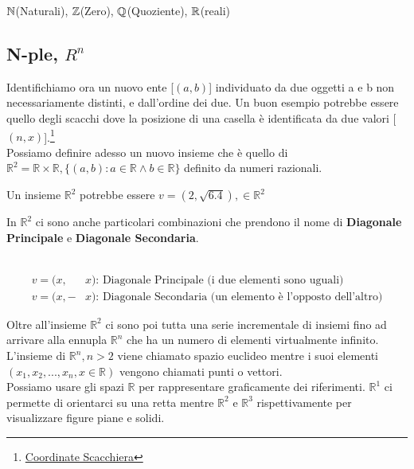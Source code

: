 $\mathbb{\MakeUppercase{n}}$(Naturali),
$\mathbb{\MakeUppercase{z}}$(Zero),
$\mathbb{\MakeUppercase{q}}$(Quoziente), $\mathbb{\MakeUppercase{r}}$(reali)

\subsection{N-ple, $R^n$}

Identifichiamo ora un nuovo ente [$(a,b)$] individuato da due oggetti
a e b non necessariamente distinti, e dall'ordine dei due. Un buon
esempio potrebbe essere quello degli scacchi dove la posizione di una
casella è identificata da due valori
[$(n,x)$].\footnote{\href{https://upload.wikimedia.org/wikipedia/commons/thumb/b/b6/SCD_algebraic_notation.svg/1200px-SCD_algebraic_notation.svg.png}{Coordinate
Scacchiera}}
\leavevmode\\
Possiamo definire adesso un nuovo insieme che è quello di
$\mathbb{R}^{2}=\mathbb{R}\times \mathbb{R}, \{(a,b):a\in \mathbb{R}
\wedge b\in \mathbb{R}\}$ definito da numeri razionali.
\begin{es}
  Un insieme $\mathbb{R}^{2}$ potrebbe essere $v=(2,\sqrt{6.4}), \in
  \mathbb{R}^{2}$
\end{es}

\begin{nota}
  In $\mathbb{R}^{2}$ ci sono anche particolari combinazioni che
  prendono il nome di \textbf{Diagonale Principale} e
  \textbf{Diagonale Secondaria}.
  \begin{es}
    \phantom{}\\
    \begin{align*}
      v=(x,&x) \text{: Diagonale Principale (i due elementi sono uguali)}\\
      v=(x,-&x) \text{: Diagonale Secondaria (un elemento è l'opposto
      dell'altro)}
    \end{align*}
  \end{es}
\end{nota}

Oltre all'insieme $\mathbb{R}^{2}$ ci sono poi tutta una serie
incrementale di insiemi fino ad arrivare alla ennupla
$\mathbb{R}^{n}$ che ha un numero di elementi virtualmente infinito.
L'insieme di $\mathbb{R}^{n}, n>2$ viene chiamato spazio euclideo
mentre i suoi elementi $(x_{1},x_{2},...,x_{n}, x\in \mathbb{R})$
vengono chiamati punti o vettori.\\
Possiamo usare gli spazi $\mathbb{R}$ per rappresentare graficamente
dei riferimenti. $\mathbb{R}^{1}$ ci permette di orientarci su una
retta mentre $\mathbb{R}^{2}$ e $\mathbb{R}^{3}$ rispettivamente per
visualizzare figure piane e solidi.

